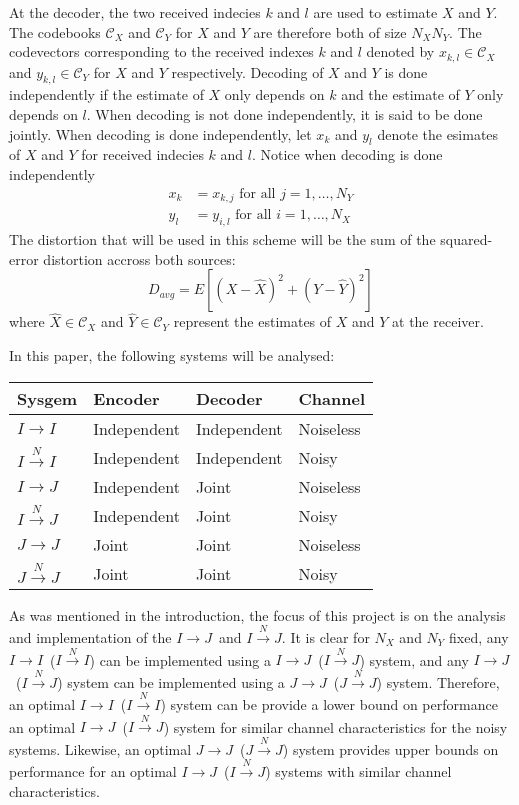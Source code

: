 \documentclass[10pt]{article}
\newcommand{\sysIIN}{\mbox{$I \overset{N}{\rightarrow} I$}}
\newcommand{\sysII}{\mbox{$I \rightarrow I$}}
\newcommand{\sysIJN}{\mbox{$I \overset{N}{\rightarrow} J$}}
\newcommand{\sysIJ}{\mbox{$I \rightarrow J$}}
\newcommand{\sysJJN}{\mbox{$J \overset{N}{\rightarrow} J$}}
\newcommand{\sysJJ}{\mbox{$J \rightarrow J$}}
\begin{document}
At the decoder, the two received indecies $k$ and $l$ are used to estimate $X$ and $Y$. The codebooks $\mathcal{C}_X$ and $\mathcal{C}_Y$ for $X$ and $Y$ are therefore both of size $N_X N_Y$. The codevectors corresponding to the received indexes $k$ and $l$ denoted by $x_{k,l} \in \mathcal{C}_X$ and $y_{k,l} \in \mathcal{C}_Y$ for $X$ and $Y$ respectively. Decoding of $X$ and $Y$ is done independently if the estimate of $X$ only depends on $k$ and the estimate of $Y$ only depends on $l$. When decoding is not done independently, it is said to be done jointly. When decoding is done independently, let $x_k$ and $y_l$ denote the esimates of $X$ and $Y$ for received indecies $k$ and $l$. Notice when decoding is done independently
\begin{align}
x_k &= x_{k,j} \text{ for all } j=1,\ldots,N_Y \\
y_l &= y_{i,l} \text{ for all } i=1,\ldots,N_X
\end{align}
The distortion that will be used in this scheme will be the sum of the squared-error distortion accross both sources:
\begin{equation}
    D_{avg} = E[{(X-\hat{X})}^2 + {(Y-\hat{Y})}^2]
\end{equation}
where $\hat{X} \in \mathcal{C}_X$ and $\hat{Y} \in \mathcal{C}_Y$ represent the estimates of $X$ and $Y$ at the receiver.

In this paper, the following systems will be analysed:

\begin{center}
    \begin{tabular}{| l | l | l | l |}
    \hline
    \bf Sysgem & \bf Encoder & \bf Decoder & \bf Channel \\ \hline \hline
    \sysII & Independent & Independent & Noiseless \\ \hline
    \sysIIN & Independent & Independent & Noisy \\ \hline
    \sysIJ & Independent & Joint & Noiseless \\ \hline
    \sysIJN & Independent & Joint & Noisy \\ \hline
    \sysJJ & Joint & Joint & Noiseless \\ \hline
    \sysJJN & Joint & Joint & Noisy \\ \hline
    \end{tabular}
\end{center}

As was mentioned in the introduction, the focus of this project is on the analysis and implementation of the \sysIJ\ and \sysIJN. It is clear for $N_X$ and $N_Y$ fixed, any \sysII\ (\sysIIN) can be implemented using a \sysIJ\ (\sysIJN) system, and any \sysIJ\ (\sysIJN) system can be implemented using a \sysJJ\ (\sysJJN) system. Therefore, an optimal \sysII\ (\sysIIN) system can be  provide a lower bound on performance an optimal \sysIJ\ (\sysIJN) system for similar channel characteristics for the noisy systems. Likewise, an optimal \sysJJ\ (\sysJJN) system provides upper bounds on performance for an optimal \sysIJ\ (\sysIJN) systems with similar channel characteristics.
\end{document}
